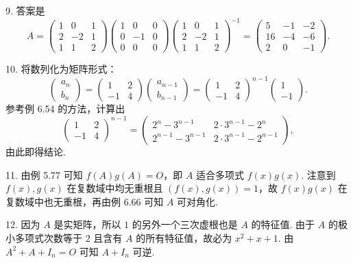 \documentclass[UTF8, 12pt, fontset=fandol, oneside]{ctexart}
\begin{document}
9. 答案是
\[
A=
\begin{pmatrix}1&0&1\\2&-2&1\\1&1&2\end{pmatrix}
\begin{pmatrix}1&0&0\\0&-1&0\\0&0&0\end{pmatrix}
\begin{pmatrix}1&0&1\\2&-2&1\\1&1&2\end{pmatrix}^{-1}
=
\begin{pmatrix}5&-1&-2\\16&-4&-6\\2&0&-1\end{pmatrix}.
\]

10. 将数列化为矩阵形式：
\[
\begin{pmatrix}a_n\\b_n\end{pmatrix}
=
\begin{pmatrix}1&2\\-1&4\end{pmatrix}
\begin{pmatrix}a_{n-1}\\b_{n-1}\end{pmatrix}
=
\begin{pmatrix}1&2\\-1&4\end{pmatrix}^{n-1}
\begin{pmatrix}1\\-1\end{pmatrix}.
\]
参考例 6.54 的方法，计算出
\[
\begin{pmatrix}1&2\\-1&4\end{pmatrix}^{n-1}
=
\begin{pmatrix}
2^n-3^{n-1}&2\cdot 3^{n-1}-2^n\\
2^{n-1}-3^{n-1}&2\cdot 3^{n-1}-2^{n-1}
\end{pmatrix},
\]
由此即得结论.

11. 由例 5.77 可知 $f(A)g(A)=O$，即 $A$ 适合多项式 $f(x)g(x)$. 注意到 $f(x),g(x)$ 在复数域中均无重根且 $(f(x),g(x))=1$，故 $f(x)g(x)$ 在复数域中也无重根，再由例 6.66 可知 $A$ 可对角化.

12. 因为 $A$ 是实矩阵，所以 $1$ 的另外一个三次虚根也是 $A$ 的特征值. 由于 $A$ 的极小多项式次数等于 $2$ 且含有 $A$ 的所有特征值，故必为 $x^2+x+1$. 由 $A^2+A+I_n=O$ 可知 $A+I_n$ 可逆.
\end{document}
